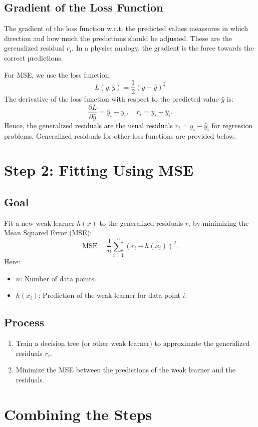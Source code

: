 \documentclass[12pt]{article}
\begin{document}
\subsection*{Gradient of the Loss Function}
The gradient of the loss function w.r.t. the predicted values meassures in which direction 
and how much the predictions should be adjusted. These are the gerenalized residual $r_i$. 
In a physics analogy, the gradient is the force towards the correct predictions.

For MSE, we use the loss function:
\[
L(y, \hat{y}) = \frac{1}{2}(y - \hat{y})^2
\]
The derivative of the loss function with respect to the predicted value \( \hat{y} \) is:
\[
\frac{\partial L}{\partial \hat{y}} = \hat{y}_i - y_i , \quad r_i = y_i - \hat{y}_i.
\]
Hence, the generalized residuals are the usual residuals \( r_i = y_i - \hat{y}_i \) for regression problems. 
Generalized residuals for other loss functions are provided below.



\section*{Step 2: Fitting Using MSE}
\subsection*{Goal}
Fit a new weak learner \( h(x) \) to the generalized residuals \( r_i \) by minimizing the Mean Squared Error (MSE):
\[
\text{MSE} = \frac{1}{n} \sum_{i=1}^n (r_i - h(x_i))^2.
\]
Here:
\begin{itemize}
    \item \( n \): Number of data points.
    \item \( h(x_i) \): Prediction of the weak learner for data point \( i \).
\end{itemize}

\subsection*{Process}
\begin{enumerate}
    \item Train a decision tree (or other weak learner) to approximate the generalized residuals \( r_i \).
    \item Minimize the MSE between the predictions of the weak learner and the residuals.
\end{enumerate}

\section*{Combining the Steps}
\end{document}
